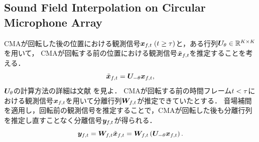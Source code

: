 \documentclass[sip,biber]{now-journal}
\begin{document}
\subsection{Sound Field Interpolation on Circular Microphone Array}
CMAが回転した後の位置における観測信号$\Obs _{\ft}\; (\tframe \geq \rotFra)$と，ある行列$\bm{U} _{\theta} \in \mathbb{R} ^{K\times K}$を用いて，
CMAが回転する前の位置における観測信号$\irot{\Obs} _{\ft}$を推定することを考える．
\begin{equation}
  \irot{\Obs} _{\ft} = \rotMat _{-\rotDeg} \Obs _{\ft},
\end{equation}
$\bm{U} _{\theta}$の計算方法の詳細は文献 \cite{Wakabayashi:2023:ASLP} を見よ．
CMAが回転する前の時間フレーム$t < \tau$における観測信号$\Obs _{\ft}$を用いて分離行列$\Demix _{\ft}$が推定できていたとする．
音場補間を適用し，回転前の観測信号を推定することで，CMAが回転した後も分離行列を推定し直すことなく分離信号$\Est _{\ft}$が得られる．
\begin{equation}
  \Est _{\ft} = \Demix _{\ft} \irot{\Obs} _{\ft} = \Demix _{\ft} \left(\rotMat _{-\rotDeg} \Obs _{\ft}\right).
\end{equation}



\end{document}
